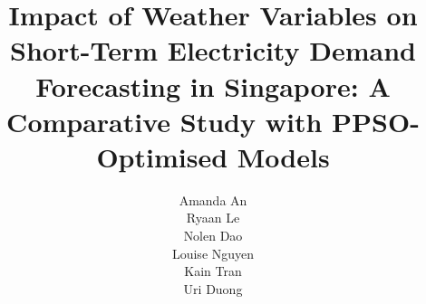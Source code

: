 \documentclass{template}
\begin{document}

\title{\huge{Impact of Weather Variables on Short-Term Electricity Demand Forecasting in Singapore: A Comparative Study with PPSO-Optimised Models}}
\author{Amanda An \\ Ryaan Le \\ Nolen Dao \\ Louise Nguyen \\ Kain Tran \\ Uri Duong}

\makeatletter
\def\declpage{%
\prefacesection{Acknowledgements}
    We would like to thank Dr.\ Young Lee for his guidance, constructive
    feedback throughout this project. We also thank the
    Singapore Energy Market Authority (EMA) for making electricity demand
    data publicly available, and the open-source communities behind
    scikit-learn, XGBoost, CatBoost, and the Open-Meteo weather API,
    whose tools made this work possible.
\vfill}
\makeatother

\beforeabstract
\afterabstract








\footnotesize
\printbibliography
\normalsize
\end{document}
